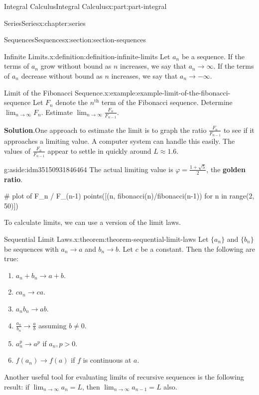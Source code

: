 \documentclass[twoside,10pt,]{tufte-book}
\newcommand{\blocktitlefont}{\relax}
\newcommand{\terminology}[1]{\textbf{#1}}
\numberwithin{equation}{part}
\newcommand{\gt}{>}
\begin{document}
\begin{partptx}{Integral Calculus}{}{Integral Calculus}{}{}{x:part:part-integral}
\begin{chapterptx}{Series}{}{Series}{}{}{x:chapter:series}
\begin{sectionptx}{Sequences}{}{Sequences}{}{}{x:section:section-sequences}
\begin{definition}{Infinite Limits.}{x:definition:definition-infinite-limits}
Let \(a_{n}\) be a sequence. If the terms of \(a_{n}\) grow without bound as \(n\) increases, we say that \(a_{n}\to\infty\). If the terms of \(a_{n}\) decrease without bound as \(n\) increases, we say that \(a_{n}\to-\infty\).%
\end{definition}
\begin{example}{Limit of the Fibonacci Sequence.}{x:example:example-limit-of-the-fibonacci-sequence}%
Let \(F_{n}\) denote the \(n^{\text{th}}\) term of the Fibonacci sequence. Determine \(\lim_{n\to\infty}F_{n}\). Estimate \(\lim_{n\to\infty}\frac{F_{n}}{F_{n-1}}\).%
\par\smallskip%
\noindent\textbf{\blocktitlefont Solution}.\hypertarget{g:solution:idm35150931848128}{}\quad{}One approach to estimate the limit is to graph the ratio \(\frac{F_n}{F_{n-1}}\) to see if it approaches a limiting value. A computer system can handle this easily. The values of \(\frac{F_n}{F_{n-1}}\) appear to settle in quickly around \(L\approx1.6\). \begin{aside}{}{g:aside:idm35150931846464}%
The actual limiting value is \(\varphi = \frac{1+\sqrt{5}}{2}\), the \terminology{golden ratio}.%
\end{aside}
%
\end{example}
\begin{sageinput}
# plot of F_n / F_(n-1)
points([(n, fibonacci(n)/fibonacci(n-1)) for n in range(2, 50)])
\end{sageinput}
To calculate limits, we can use a version of the limit laws.%
\begin{theorem}{Sequential Limit Laws.}{}{x:theorem:theorem-sequential-limit-laws}%
Let \(\{a_{n}\}\) and \(\{b_{n}\}\) be sequences with \(a_{n}\to a\) and \(b_{n}\to b\). Let \(c\) be a constant. Then the following are true:%
%
\begin{enumerate}
\item{}\(\displaystyle a_{n} + b_{n} \to a + b.\)%
\item{}\(\displaystyle ca_{n}\to ca.\)%
\item{}\(\displaystyle a_{n}b_{n}\to ab.\)%
\item{}\(\frac{a_{n}}{b_{n}}\to\frac{a}{b}\) assuming \(b\neq 0\).%
\item{}\(a_{n}^{p}\to a^{p}\) if \(a_{n},p \gt 0\).%
\item{}\(f(a_{n})\to f(a)\) if \(f\) is continuous at \(a\).%
\end{enumerate}
\end{theorem}
Another useful tool for evaluating limits of recursive sequences is the following result: if \(\lim_{n\to\infty}a_{n} = L\), then \(\lim_{n\to\infty}a_{n-1} = L\) also.%

\end{sectionptx}
\end{chapterptx}
\end{partptx}
\end{document}
